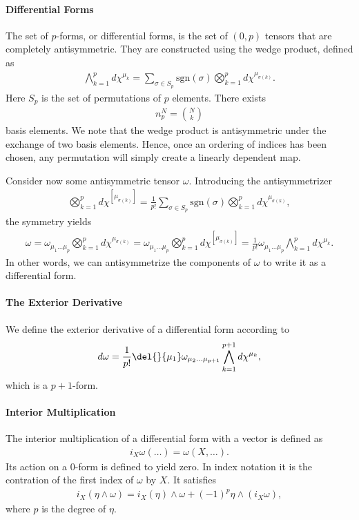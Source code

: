 \paragraph{Differential Forms}
The set of $p$-forms, or differential forms, is the set of $(0, p)$ tensors that are completely antisymmetric. They are constructed using the wedge product, defined as
\begin{align*}
	\bigwedge\limits_{k = 1}^{p}d\chi^{\mu_{k}} = \sum\limits_{\sigma\in S_{p}}\text{sgn}(\sigma)\bigotimes_{k = 1}^{p}d\chi^{\mu_{\sigma(k)}}.
\end{align*}
Here $S_{p}$ is the set of permutations of $p$ elements. There exists
\begin{align*}
	n_{p}^{N} = {N\choose k}
\end{align*}
basis elements. We note that the wedge product is antisymmetric under the exchange of two basis elements. Hence, once an ordering of indices has been chosen, any permutation will simply create a linearly dependent map.

Consider now some antisymmetric tensor $\omega$. Introducing the antisymmetrizer
\begin{align*}
	\bigotimes_{k = 1}^{p}d\chi^{[\mu_{\sigma(k)}]} = \frac{1}{p!}\sum\limits_{\sigma\in S_{p}}\text{sgn}(\sigma)\bigotimes_{k = 1}^{p}d\chi^{\mu_{\sigma(k)}},
\end{align*}
the symmetry yields
\begin{align*}
	\omega = \omega_{\mu_{1}\dots \mu_{p}}\bigotimes_{k = 1}^{p}d\chi^{\mu_{\sigma(k)}} = \omega_{\mu_{1}\dots \mu_{p}}\bigotimes_{k = 1}^{p}d\chi^{[\mu_{\sigma(k)}]} = \frac{1}{p!}\omega_{\mu_{1}\dots \mu_{p}}\bigwedge\limits_{k = 1}^{p}d\chi^{\mu_{k}}.
\end{align*}
In other words, we can antisymmetrize the components of $\omega$ to write it as a differential form.

\paragraph{The Exterior Derivative}
We define the exterior derivative of a differential form according to
\begin{align*}
	d\omega = \frac{1}{p!}\del{}{\mu_{1}}\omega_{\mu_{2}\dots \mu_{p + 1}}\bigwedge\limits_{k = 1}^{p + 1}d\chi^{\mu_{k}},
\end{align*}
which is a $p + 1$-form.

\paragraph{Interior Multiplication}
The interior multiplication of a differential form with a vector is defined as
\begin{align*}
	i_{X}\omega(\dots) = \omega(X, \dots).
\end{align*}
Its action on a 0-form is defined to yield zero. In index notation it is the contration of the first index of $\omega$ by $X$. It satisfies
\begin{align*}
	i_{X}(\eta\wedge\omega) = i_{X}(\eta)\wedge\omega + (-1)^{p}\eta\wedge(i_{X}\omega),
\end{align*}
where $p$ is the degree of $\eta$.

